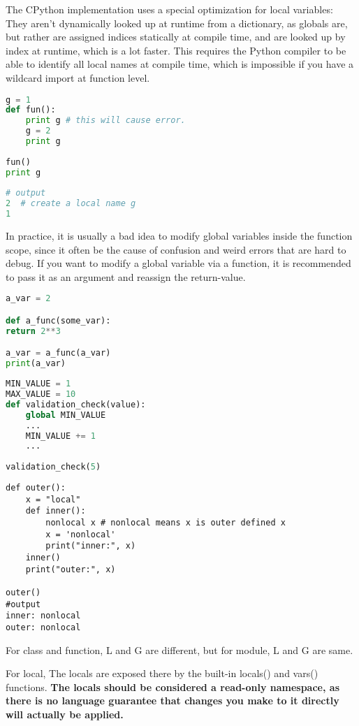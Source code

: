 \documentclass[a4paper,12pt,twoside]{book}
\begin{document}
The CPython implementation uses a special optimization for local variables: They aren't dynamically looked up at runtime from a dictionary, as globals are, but rather are assigned indices statically at compile time, and are looked up by index at runtime, which is a lot faster. This requires the Python compiler to be able to identify all local names at compile time, which is impossible if you have a wildcard import at function level.
\begin{lstlisting}[frame=single, language=Python]
g = 1
def fun():
	print g # this will cause error. 
	g = 2
	print g
	
fun()
print g
	
# output 
2  # create a local name g
1
\end{lstlisting}
	
In practice, it is usually a bad idea to modify global variables inside the function scope, since it often be the cause of confusion and weird errors that are hard to debug. If you want to modify a global variable via a function, it is recommended to pass it as an argument and reassign the return-value.
\begin{lstlisting}[frame=single, language=Python]
a_var = 2

def a_func(some_var):
return 2**3

a_var = a_func(a_var)
print(a_var)
\end{lstlisting} 

\begin{lstlisting}[frame=single, language=Python]
MIN_VALUE = 1
MAX_VALUE = 10
def validation_check(value):
	global MIN_VALUE
	...
	MIN_VALUE += 1
	...
	
validation_check(5)
\end{lstlisting} 

\begin{lstlisting}
def outer():
	x = "local"
	def inner():
		nonlocal x # nonlocal means x is outer defined x
		x = 'nonlocal'
		print("inner:", x)
	inner()
	print("outer:", x)
	
outer()
#output
inner: nonlocal
outer: nonlocal
\end{lstlisting}
	
For class and function, L and G are different, but for module, L and G are same.

For local, The locals are exposed there by the built-in locals() and vars() functions. \textbf{The locals should be considered a read-only namespace, as there is no language guarantee that changes you make to it directly will actually be applied.}
\end{document}
